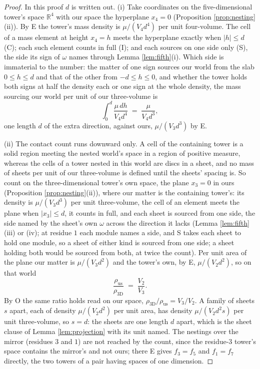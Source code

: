\documentclass[11pt]{article}
\theoremstyle{definition}
\newcommand{\R}{\mathbb{R}}
\begin{document}
\begin{proof}
In this proof $d$ is written out. (i) Take coordinates on the five-dimensional tower's space $\R^{4}$ with our space the hyperplane $x_{4} = 0$ (Proposition \ref{prop:nesting}(ii)). By E the tower's mass density is $\mu/(V_{4}d^{4})$ per unit four-volume. The cell of a mass element at height $x_{4} = h$ meets the hyperplane exactly when $|h| \leq d$ (C); each such element counts in full (I); and each sources on one side only (S), the side its sign of $\omega$ names through Lemma \ref{lem:fifth}(i). Which side is immaterial to the number: the matter of one sign sources our world from the slab $0 \leq h \leq d$ and that of the other from $-d \leq h \leq 0$, and whether the tower holds both signs at half the density each or one sign at the whole density, the mass sourcing our world per unit of our three-volume is
\[
\int_{0}^{d}\frac{\mu\,dh}{V_{4}d^{4}} \;=\; \frac{\mu}{V_{4}d^{3}},
\]
one length $d$ of the extra direction, against ours, $\mu/(V_{3}d^{3})$ by E.

(ii) The contact count runs downward only. A cell of the containing tower is a solid region meeting the nested world's space in a region of positive measure, whereas the cells of a tower nested in this world are discs in a sheet, and no mass of sheets per unit of our three-volume is defined until the sheets' spacing is. So count on the three-dimensional tower's own space, the plane $x_{3} = 0$ in ours (Proposition \ref{prop:nesting}(ii)), where our matter is the containing tower's: its density is $\mu/(V_{3}d^{3})$ per unit three-volume, the cell of an element meets the plane when $|x_{3}| \leq d$, it counts in full, and each sheet is sourced from one side, the side named by the sheet's own $\omega$ across the direction it lacks (Lemma \ref{lem:fifth}(iii) or (iv); at residue $1$ each module names a side, and S takes each sheet to hold one module, so a sheet of either kind is sourced from one side; a sheet holding both would be sourced from both, at twice the count). Per unit area of the plane our matter is $\mu/(V_{3}d^{2})$ and the tower's own, by E, $\mu/(V_{2}d^{2})$, so on that world
\[
\frac{\rho_{\mathrm{us}}}{\rho_{3\mathrm{D}}} \;=\; \frac{V_{2}}{V_{3}} .
\]
By O the same ratio holds read on our space, $\rho_{3\mathrm{D}}/\rho_{\mathrm{us}} = V_{3}/V_{2}$. A family of sheets $s$ apart, each of density $\mu/(V_{2}d^{2})$ per unit area, has density $\mu/(V_{2}d^{2}s)$ per unit three-volume, so $s = d$: the sheets are one length $d$ apart, which is the sheet clause of Lemma \ref{lem:projection} with its unit named. The nestings over the mirror (residues $3$ and $1$) are not reached by the count, since the residue-$3$ tower's space contains the mirror's and not ours; there E gives $f_{3} = f_{5}$ and $f_{1} = f_{7}$ directly, the two towers of a pair having spaces of one dimension.


\end{proof}
\end{document}
